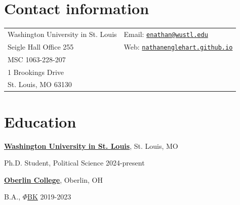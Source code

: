 \documentclass[margin,line,pifont,palatino,courier]{res}
\newenvironment{list1}{
  \begin{list}{\ding{113}}{%
      \setlength{\itemsep}{0in}
      \setlength{\parsep}{0in} \setlength{\parskip}{0in}
      \setlength{\topsep}{0in} \setlength{\partopsep}{0in}
      \setlength{\leftmargin}{0.17in}}}{\end{list}}
\begin{document}
\title{}
\begin{resume}

\section{\sc Contact information}

\vspace{.05in}
\begin{tabular}{@{}p{2.75in}p{2.5in}}
Washington University in St. Louis & Email: \href{mailto:enathan@wustl.edu}{\texttt{enathan@wustl.edu}} \\
Seigle Hall Office 255                      & Web: \href{https://nathanenglehart.github.io}{\texttt{nathanenglehart.github.io}} \\
MSC 1063-228-207 \\                     %
1 Brookings Drive \\		     %
St. Louis, MO 63130                  
             
\end{tabular}

%

\section{\sc Education} 
\href{https://washu.edu/}{\textbf{Washington University in St. Louis}}, St. Louis, MO
\begin{list1}
\item[] Ph.D. Student, Political Science \hfill{2024-present}
\end{list1}
\href{https://www.oberlin.edu/}{\textbf{Oberlin College}}, Oberlin, OH
\begin{list1}
\item[] B.A., \href{https://www.pbk.org/}{$\Phi$BK}  \hfill{2019-2023} 
\end{list1}


\end{resume}
\end{document}
